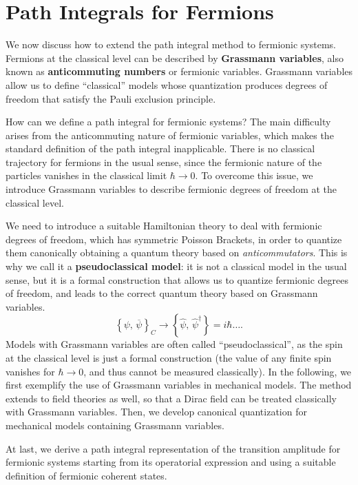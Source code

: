 \section{Path Integrals for Fermions}

We now discuss how to extend the path integral method to fermionic systems. Fermions at the classical level can be described by \textbf{Grassmann variables}, also known as \textbf{anticommuting numbers} or fermionic variables. Grassmann variables allow us to define “classical” models whose quantization produces degrees of freedom that satisfy the Pauli exclusion principle.

How can we define a path integral for fermionic systems? The main difficulty arises from the anticommuting nature of fermionic variables, which makes the standard definition of the path integral inapplicable. There is no classical trajectory for fermions in the usual sense, since the fermionic nature of the particles vanishes in the classical limit \(\hbar \to 0\). To overcome this issue, we introduce Grassmann variables to describe fermionic degrees of freedom at the classical level.

We need to introduce a suitable Hamiltonian theory to deal with fermionic degrees of freedom, which has symmetric Poisson Brackets, in order to quantize them canonically obtaining a quantum theory based on \textit{anticommutators}.
This is why we call it a \textbf{pseudoclassical model}: it is not a classical model in the usual sense, but it is a formal construction that allows us to quantize fermionic degrees of freedom, and leads to the correct quantum theory based on Grassmann variables.
\[
    \left\{ \psi,\,\overline{\psi} \right\}_{C} \longrightarrow \left\{ \hat{\psi},\,\hat{\psi}^\dagger \right\} = i \hbar \dots .
\]
Models with Grassmann variables are often called “pseudoclassical”, as the spin at the classical level is just a formal construction (the value of any finite spin vanishes for \(\hbar \to  0\), and thus cannot be measured classically). In the following, we first exemplify the use of Grassmann variables in mechanical models. The method extends to field theories as well, so that a Dirac field can be treated classically with Grassmann variables. Then, we develop canonical quantization for mechanical models containing Grassmann variables.

At last, we derive a path integral representation of the transition amplitude for fermionic systems starting from its operatorial expression and using a suitable definition of fermionic coherent states.

